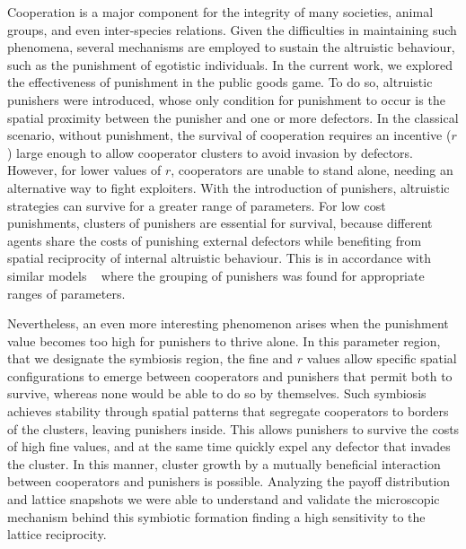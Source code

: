 \documentclass[5p]{elsarticle}
\begin{document}
Cooperation is a major component for the integrity of many societies, animal groups, and even inter-species relations. Given the difficulties in maintaining such phenomena, several mechanisms are employed to sustain the altruistic behaviour, such as the punishment of egotistic individuals.
%
In the current work, we explored the effectiveness of punishment in the public goods game. To do so, altruistic punishers were introduced, whose only condition for punishment to occur is the spatial proximity between the punisher and one or more defectors.
%
In the classical scenario, without punishment, the survival of cooperation requires an incentive ($ r $) large enough to allow cooperator clusters to avoid invasion by defectors. However, for lower values {of $r$}, cooperators are unable to stand alone, needing an alternative way to fight exploiters. 
%
With the introduction of punishers, altruistic strategies can survive for a greater range of parameters. 
%
{For low cost punishments, clusters of punishers are essential for survival, because different agents share the costs of punishing  external defectors while benefiting from spatial reciprocity of internal altruistic behaviour. %
This is in accordance with similar models  }~\cite{brandt2003punishment, Helbing_2010} {where the grouping of punishers was found for appropriate ranges of parameters.}

Nevertheless, an even more interesting phenomenon arises when the punishment value becomes too {high for punishers to thrive alone}. In this parameter region, that we designate the symbiosis region, the fine and $r$ values allow specific spatial configurations to emerge between cooperators and punishers that permit both to survive, whereas none would be able to do so by themselves. 
%
Such symbiosis achieves stability through spatial patterns that segregate cooperators to borders of the clusters, leaving punishers inside. This allows punishers to survive the costs of high fine values{, and at the same time quickly expel  any defector that invades the cluster.}   { In this manner, } cluster growth  by a mutually beneficial interaction between cooperators and punishers {is possible}.
%
Analyzing the payoff distribution and lattice snapshots we were able to understand and validate the microscopic mechanism behind this symbiotic formation finding a high sensitivity to the lattice {reciprocity.} 
%
\end{document}
